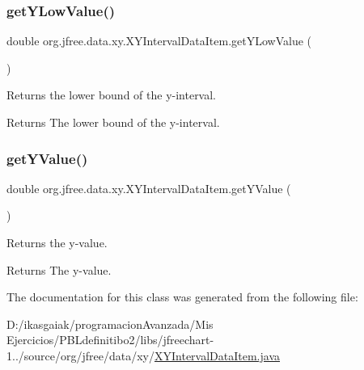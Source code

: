 \subsubsection{\texorpdfstring{get\+Y\+Low\+Value()}{getYLowValue()}}
{\footnotesize\ttfamily double org.\+jfree.\+data.\+xy.\+X\+Y\+Interval\+Data\+Item.\+get\+Y\+Low\+Value (\begin{DoxyParamCaption}{ }\end{DoxyParamCaption})}

Returns the lower bound of the y-\/interval.

\begin{DoxyReturn}{Returns}
The lower bound of the y-\/interval. 
\end{DoxyReturn}
\mbox{\label{classorg_1_1jfree_1_1data_1_1xy_1_1_x_y_interval_data_item_ac52f103bfad819bead350722b74bdded}} 
\subsubsection{\texorpdfstring{get\+Y\+Value()}{getYValue()}}
{\footnotesize\ttfamily double org.\+jfree.\+data.\+xy.\+X\+Y\+Interval\+Data\+Item.\+get\+Y\+Value (\begin{DoxyParamCaption}{ }\end{DoxyParamCaption})}

Returns the y-\/value.

\begin{DoxyReturn}{Returns}
The y-\/value. 
\end{DoxyReturn}


The documentation for this class was generated from the following file\+:\begin{DoxyCompactItemize}
\item 
D\+:/ikasgaiak/programacion\+Avanzada/\+Mis Ejercicios/\+P\+B\+Ldefinitibo2/libs/jfreechart-\/1../source/org/jfree/data/xy/\mbox{\hyperlink{_x_y_interval_data_item_8java}{X\+Y\+Interval\+Data\+Item.\+java}}\end{DoxyCompactItemize}
